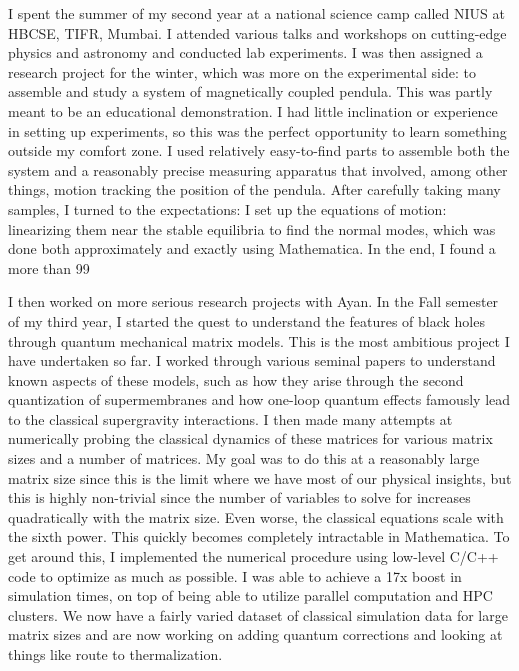 \documentclass[11pt, a4paper]{awesome-cv}
\begin{document}
\begin{cvletter}
  I spent the summer of my second year at a national science camp called NIUS at HBCSE, TIFR, Mumbai. I attended various talks and workshops on cutting-edge physics and astronomy and conducted lab experiments. I was then assigned a research project for the winter, which was more on the experimental side: to assemble and study a system of magnetically coupled pendula. This was partly meant to be an educational demonstration. I had little inclination or experience in setting up experiments, so this was the perfect opportunity to learn something outside my comfort zone. I used relatively easy-to-find parts to assemble both the system and a reasonably precise measuring apparatus that involved, among other things, motion tracking the position of the pendula. After carefully taking many samples, I turned to the expectations: I set up the equations of motion: linearizing them near the stable equilibria to find the normal modes, which was done both approximately and exactly using Mathematica. In the end, I found a more than 99%
  
  I then worked on more serious research projects with Ayan. In the Fall semester of my third year, I started the quest to understand the features of black holes through quantum mechanical matrix models. This is the most ambitious project I have undertaken so far. I worked through various seminal papers to understand known aspects of these models, such as how they arise through the second quantization of supermembranes and how one-loop quantum effects famously lead to the classical supergravity interactions. I then made many attempts at numerically probing the classical dynamics of these matrices for various matrix sizes and a number of matrices. My goal was to do this at a reasonably large matrix size since this is the limit where we have most of our physical insights, but this is highly non-trivial since the number of variables to solve for increases quadratically with the matrix size. Even worse, the classical equations scale with the sixth power. This quickly becomes completely intractable in Mathematica. To get around this, I implemented the numerical procedure using low-level C/C++ code to optimize as much as possible. I was able to achieve a 17x boost in simulation times, on top of being able to utilize parallel computation and HPC clusters. We now have a fairly varied dataset of classical simulation data for large matrix sizes and are now working on adding quantum corrections and looking at things like route to thermalization.
  

\end{cvletter}
\end{document}
